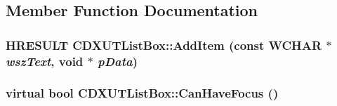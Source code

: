\subsection{Member Function Documentation}
\hypertarget{class_c_d_x_u_t_list_box_aa51de5a656dcaf651fb0d9da497c15f0}{
\subsubsection[{AddItem}]{\setlength{\rightskip}{0pt plus 5cm}HRESULT CDXUTListBox::AddItem (const WCHAR $\ast$ {\em wszText}, \/  void $\ast$ {\em pData})}}
\label{class_c_d_x_u_t_list_box_aa51de5a656dcaf651fb0d9da497c15f0}
\hypertarget{class_c_d_x_u_t_list_box_adbe71e402fd89d6382b60a35b34c0fa9}{
\subsubsection[{CanHaveFocus}]{\setlength{\rightskip}{0pt plus 5cm}virtual bool CDXUTListBox::CanHaveFocus ()}}
\label{class_c_d_x_u_t_list_box_adbe71e402fd89d6382b60a35b34c0fa9}


